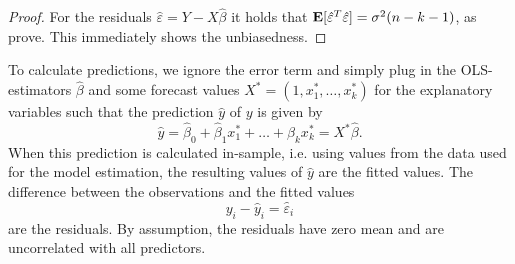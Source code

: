 \documentclass[a4paper, 12pt]{scrreprt}
\newcommand{\ew}{\mbox{\textbf{E}}}
\begin{document}
\begin{proof}
For the residuals $\hat{\varepsilon} = Y - X\hat{\beta}$ it holds that $\ew[\hat{\varepsilon}^T \hat{\varepsilon}] = \sigma^2 (n-k-1)$, as \textcite[eq. (2.1.12)]{judgei1985econometrics} prove. This immediately shows the unbiasedness.
\end{proof}

To calculate predictions, we ignore the error term and simply plug in the OLS-estimators $\hat{\beta}$ and some forecast values $X^* = (1, x_1^*, \ldots, x_k^*)$ for the explanatory variables such that the prediction $\hat{y}$ of $y$ is given by
\begin{equation}
\hat{y} = \hat{\beta}_0 + \hat{\beta}_1 x_1^* + \ldots + \hat{\beta}_k x_k^* = X^* \hat{\beta}.
\end{equation}
When this prediction is calculated in-sample, i.e. using values from the data used for the model estimation, the resulting values of $\hat{y}$ are the fitted values. The difference between the observations and the fitted values 
\begin{equation}
y_i - \hat{y}_i = \hat{\varepsilon}_i
\end{equation}
are the residuals. By assumption, the residuals have zero mean and are uncorrelated with all predictors.

\pagebreak

\bigskip\bigskip

\clearpage





\printbibliography[	heading=bibintoc,			%
										title={Bibliography},
										nottype=online]
\nocite{*} %


\end{document}
